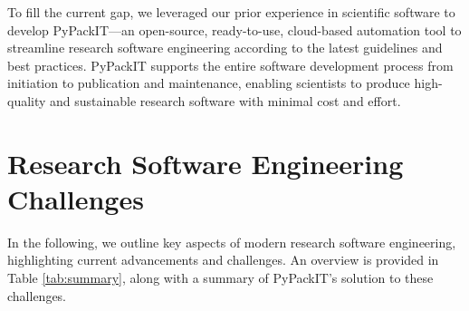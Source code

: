 \documentclass{article}
\begin{document}
To fill the current gap, we leveraged our prior experience in scientific software \cite{TeachOpenCADD} to develop PyPackIT—an open-source, ready-to-use, cloud-based automation tool to streamline research software engineering according to the latest guidelines and best practices. PyPackIT supports the entire software development process from initiation to publication and maintenance, enabling scientists to produce high-quality and sustainable research software with minimal cost and effort.


\section{Research Software Engineering Challenges}

In the following, we outline key aspects of modern research software engineering, highlighting current advancements and challenges. An overview is provided in Table \ref{tab:summary}, along with a summary of PyPackIT's solution to these challenges.
\end{document}
